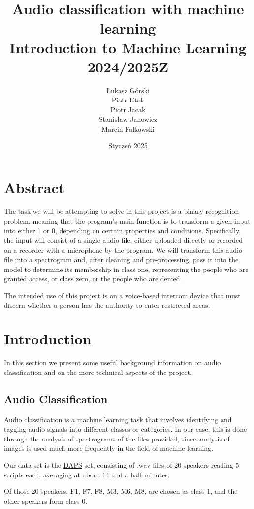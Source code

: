 \documentclass[11pt, letterpaper]{article}
\title{\textbf {Audio classification with machine learning} \\ \large Introduction to Machine Learning 2024/2025Z}
\author{Łukasz Górski \\ Piotr Iśtok \\ Piotr Jacak \\ Stanisław Janowicz \\ Marcin Falkowski}
\date{Styczeń 2025}
\begin{document}
\maketitle

\newpage
\tableofcontents
\newpage

\section{Abstract}

The task we will be attempting to solve in this project is a binary recognition problem, meaning that the program's main function is to transform a given input into either 1 or 0, depending on certain properties and conditions. Specifically, the input will consist of a single audio file, either uploaded directly or recorded on a recorder with a microphone by the program. We will transform this audio file into a spectrogram and, after cleaning and pre-processing, pass it into the model to determine its membership in class one, representing the people who are granted access, or class zero, or the people who are denied.

The intended use of this project is on a voice-based intercom device that must discern whether a person has the authority to enter restricted areas.

\section{Introduction}

In this section we present some useful background information on audio classification and on the more technical aspects of the project.

\subsection{Audio Classification}
 Audio classification is a machine learning task that involves identifying and tagging audio signals into different classes or categories. In our case, this is done through the analysis of spectrograms of the files provided, since analysis of images is used much more frequently in the field of machine learning.

 Our data set is the \href{https://www.kaggle.com/datasets/psyreddy07/daps-data}{DAPS} set, consisting of .wav files of 20 speakers reading 5 scripts each, averaging at about 14 and a half minutes.

 Of those 20 speakers, F1, F7, F8, M3, M6, M8, are chosen as class 1, and the other speakers form class 0.
\end{document}
